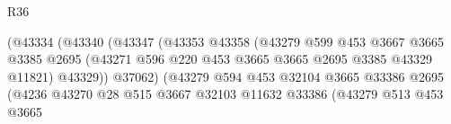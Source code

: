\begin{lexlean}{R36}
\begin{coremodule}
                                              (@43334
                                                (@43340
                                                  (@43347
                                                    (@43353
                                                      @43358
                                                      (@43279
                                                        @599
                                                        @453
                                                        @3667
                                                        @3665
                                                        @3385
                                                        @2695
                                                        (@43271
                                                          @596
                                                          @220
                                                          @453
                                                          @3665
                                                          @3665
                                                          @2695
                                                          @3385
                                                          @43329
                                                          @11821)
                                                        @43329))
                                                    @37062)
                                                  (@43279
                                                    @594
                                                    @453
                                                    @32104
                                                    @3665
                                                    @33386
                                                    @2695
                                                    (@4236
                                                      @43270
                                                      @28
                                                      @515
                                                      @3667
                                                      @32103
                                                      @11632
                                                      @33386
                                                      (@43279
                                                        @513
                                                        @453
                                                        @3665

\end{coremodule}
\end{lexlean}
